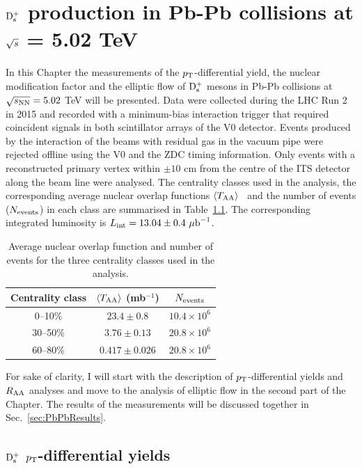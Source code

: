 \chapter{${\rm D_s^+}$ production in Pb-Pb collisions at $\sqrt{s}$ = 5.02 TeV}
\label{chap:PbPb}
In this Chapter the measurements of the $p_{\rm T}$-differential yield,
the nuclear modification factor and the elliptic flow of ${\rm D_s^+}$ mesons
in Pb-Pb collisions at $\sqrt{s_{\rm NN}} = 5.02$ TeV will be presented. Data were
collected during the LHC Run 2 in 2015 and recorded with a 
minimum-bias interaction trigger that required coincident signals in 
both scintillator arrays of the V0 detector. Events produced by 
the interaction of the beams with residual gas in the
vacuum pipe were rejected offline using the V0 and the ZDC 
timing information. Only events with a reconstructed primary vertex 
within $\pm 10$ cm from the centre of the ITS detector along
the beam line were analysed. The centrality classes 
used in the analysis, the corresponding 
average nuclear overlap functions $\left\langle T_{\rm AA} \right\rangle$~\cite{ALICE-PUBLIC-2015-008} 
and the number of events ($N_{\rm events}$) in each class 
are summarised in Table~\ref{tab:Nevents}. The corresponding 
integrated luminosity is $L_{\rm int}=13.04\pm0.4~\mathrm{\mu b}^{-1}$.\\
\begin{table}[!h]
	\centering
	\begin{tabular}{ccc}
	\hline
	Centrality class & $\langle T_{\rm AA}\rangle$ (mb$^{-1}$)& $N_{\rm events}$\\
	\hline
	\phantom{0}0--10\% & $23.4\pm0.8$ & $10.4 \times 10^6$ \\
	30--50\% & $3.76\pm0.13$ & $20.8 \times 10^6$\\
	60--80\% & $0.417 \pm 0.026$ & $20.8 \times 10^6$\\
	\hline
	\end{tabular}		
	\caption{Average nuclear overlap function and number of events  for the three centrality classes used in the analysis.}
	\label{tab:Nevents}
\end{table}

For sake of clarity, I will start with the description of $p_{\rm T}$-differential yields and $R_{\rm AA}$ 
analyses and move to the analysis of elliptic flow in the second part of the Chapter. 
The results of the measurements will be discussed together in Sec.~\ref{sec:PbPbResults}.

\section{${\rm D_s^+}$ $p_{\rm T}$-differential yields}
\label{sec:YieldsAndRaa}
